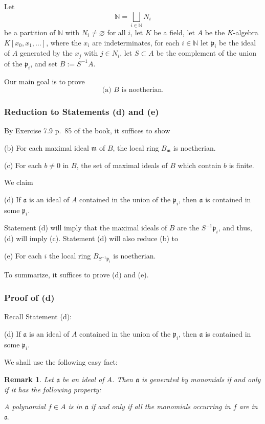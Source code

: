 \documentclass[parskip=half,fontsize=12pt]{scrartcl}%
\newcommand{\mf}{\mathfrak}
\newcommand{\aaa}{\mf a}
\newcommand{\mmm}{\mf m}
\newcommand{\ppp}{\mf p}
\newtheorem{rk}[thm]{Remark}
\begin{document}
Let 
$$
\mathbb N=\bigsqcup_{i\in\mathbb N}N_i
$$ 
be a partition of $\mathbb N$ with $N_i\ne\varnothing$ for all $i$, let $K$ be a field, let $A$ be the $K$-algebra $K[x_0,x_1,\dots]$, where the $x_i$ are indeterminates, for each $i\in\mathbb N$ let $\ppp_i$ be the ideal of $A$ generated by the $x_j$ with $j\in N_i$, let $S\subset A$ be the complement of the union of the $\ppp_i$, and set $B:=S^{-1}A$. 

Our main goal is to prove 
$$
\text{(a) $B$ is noetherian.} 
$$ 
\subsubsection{Reduction to Statements (d) and (e)}

By Exercise 7.9 p.~85 of the book, it suffices to show 

(b) For each maximal ideal $\mmm$ of $B$, the local ring $B_\mmm$ is noetherian.

(c) For each $b\ne0$ in $B$, the set of maximal ideals of $B$ which contain $b$ is
finite.

We claim 

(d) If $\aaa$ is an ideal of $A$ contained in the union of the $\ppp_i$, then $\aaa$ is contained in some $\ppp_i$. %

Statement (d) will imply that the maximal ideals of $B$ are the $S^{-1}\ppp_i$, and thus, (d) will imply (c). Statement (d) will also reduce (b) to 

(e) For each $i$ the local ring $B_{S^{-1}\ppp_i}$ is noetherian.

To summarize, it suffices to prove (d) and (e). 

\subsubsection{Proof of (d)}

Recall Statement (d):

(d) If $\aaa$ is an ideal of $A$ contained in the union of the $\ppp_i$, then $\aaa$ is contained in some $\ppp_i$.

We shall use the following easy fact: 

\begin{rk}\label{monid}
Let $\aaa$ be an ideal of $A$. Then $\aaa$ is generated by monomials if and only if it has the following property:

A polynomial $f\in A$ is in $\aaa$ if and only if all the monomials occurring in $f$ are in $\aaa$.
\end{rk}
\end{document}
